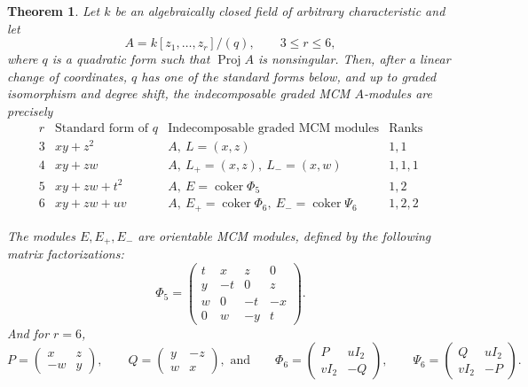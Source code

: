 \documentclass[11pt,letterpaper]{amsart}
\theoremstyle{plain}
\newtheorem{thm}{Theorem}[section]
\theoremstyle{definition}
\theoremstyle{remark}
\begin{document}
\begin{thm}\cite{10.1007/BFb0078838}\label{thm:graded-mcm-quadrics}
Let \(k\) be an algebraically closed field of arbitrary characteristic and let 
\[
A=k[z_1,\ldots,z_r]/(q),
\qquad 3\leq r\leq6,
\]
where \(q\) is a quadratic form such that \(\operatorname{Proj}A\) is
nonsingular. Then, after a linear change of coordinates,
$q$ has one of the standard forms below, and up to graded isomorphism and degree shift, the
indecomposable graded MCM \(A\)-modules are precisely
\[
\begin{array}{c|c|l|c}
r & \text{Standard form of }q
  & \text{Indecomposable graded MCM modules}
  & \text{Ranks}\\ \hline
3 & xy+z^2
  & A,\ L=(x,z) & 1,1\\
4 & xy+zw
  & A,\ L_+=(x,z),\ L_-=(x,w) & 1,1,1\\
5 & xy+zw+t^2
  & A,\ E=\operatorname{coker}\Phi_5 & 1,2\\
6 & xy+zw+uv
  & A,\ E_+=\operatorname{coker}\Phi_6,\
       E_-=\operatorname{coker}\Psi_6 & 1,2,2
\end{array}
\]

\noindent The modules $E,E_+,E_-$ are  orientable MCM modules, defined by the
following matrix factorizations:
\[
\Phi_5=
\begin{pmatrix}
t&x&z&0\\
y&-t&0&z\\
w&0&-t&-x\\
0&w&-y&t
\end{pmatrix}.
\]
And for $r=6$,
\[
P=\begin{pmatrix}x&z\\-w&y\end{pmatrix},
\qquad
Q=\begin{pmatrix}y&-z\\w&x\end{pmatrix},\text{ and}\qquad
\Phi_6=
\begin{pmatrix}P&uI_2\\vI_2&-Q\end{pmatrix},
\qquad
\Psi_6=
\begin{pmatrix}Q&uI_2\\vI_2&-P\end{pmatrix}.
\]
\end{thm}
\end{document}
